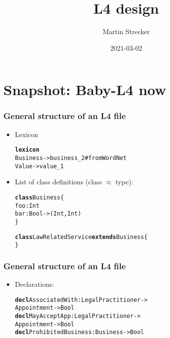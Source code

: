 \documentclass{beamer}
\title{L4 design}
\author{Martin Strecker}
\date{2021-03-02}
\begin{document}

\begin{frame}
  \titlepage
\end{frame}



\section{Snapshot: Baby-L4 now}


\begin{frame}[fragile]\frametitle{General structure of an L4 file}

  \begin{itemize}
  \item Lexicon
\begin{alltt}
\textbf{lexicon}
Business -> business_2 #from WordNet
Value -> value_1 
\end{alltt}
    
  \item List of class definitions (class $\approx$ type):
\begin{alltt}
\textbf{class} Business \{
      foo: Int
      bar: Bool -> (Int,Int)
\}

\textbf{class} LawRelatedService \textbf{extends} Business \{
\}
\end{alltt}

    
  \end{itemize}

\end{frame}


\begin{frame}[fragile]\frametitle{General structure of an L4 file}

  \begin{itemize}
  \item Declarations:
\begin{alltt}
\textbf{decl} AssociatedWith: LegalPractitioner -> 
                      Appointment -> Bool
\textbf{decl} MayAcceptApp : LegalPractitioner -> 
                      Appointment -> Bool
\textbf{decl} ProhibitedBusiness : Business -> Bool
\end{alltt}
    
  \end{itemize}

\end{frame}
\end{document}
